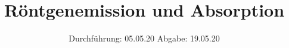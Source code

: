 

\subject{V602}
\title{Röntgenemission und Absorption}
\date{%
  Durchführung: 05.05.20
  \hspace{3em}
  Abgabe: 19.05.20
}



\maketitle
\thispagestyle{empty}
\tableofcontents
\newpage






%

\printbibliography{}


